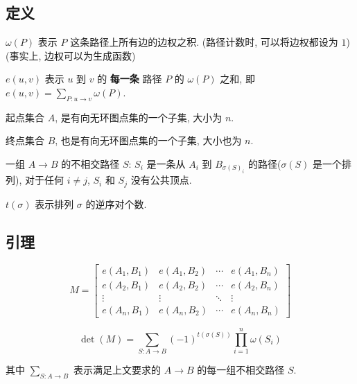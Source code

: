 \subsection{定义}

\(\omega(P)\) 表示 \(P\) 这条路径上所有边的边权之积. (路径计数时, 可以将边权都设为 \(1\)) (事实上, 边权可以为生成函数)

\(e(u, v)\) 表示 \(u\) 到 \(v\) 的 \textbf{每一条} 路径 \(P\) 的 \(\omega(P)\) 之和, 即 \(e(u, v)=\sum\limits_{P:u\rightarrow v}\omega(P)\).

起点集合 \(A\), 是有向无环图点集的一个子集, 大小为 \(n\).

终点集合 \(B\), 也是有向无环图点集的一个子集, 大小也为 \(n\).

一组 \(A\rightarrow B\) 的不相交路径 \(S\): \(S_i\) 是一条从 \(A_i\) 到 \(B_{\sigma(S)_i}\) 的路径(\(\sigma(S)\) 是一个排列), 对于任何 \(i\ne j\), \(S_i\) 和 \(S_j\) 没有公共顶点.

\(t(\sigma)\) 表示排列 \(\sigma\) 的逆序对个数.

\subsection{引理}

\[
    M = \begin{bmatrix}
        e(A_1,B_1) & e(A_1,B_2) & \cdots & e(A_1,B_n) \\
        e(A_2,B_1) & e(A_2,B_2) & \cdots & e(A_2,B_n) \\
        \vdots     & \vdots     & \ddots & \vdots     \\
        e(A_n,B_1) & e(A_n,B_2) & \cdots & e(A_n,B_n)
    \end{bmatrix}
\]

\[
    \det(M)=\sum\limits_{S:A\rightarrow B}(-1)^{t(\sigma(S))}\prod\limits_{i=1}^n \omega(S_i)
\]

其中 \(\sum\limits_{S:A\rightarrow B}\) 表示满足上文要求的 \(A\rightarrow B\) 的每一组不相交路径 \(S\).
